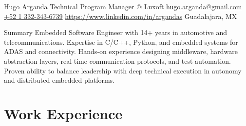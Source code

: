\documentclass{resume} %
\begin{document}

\customheader
    {Hugo Arganda}
    {Technical Program Manager @ Luxoft}
    {\href{mailto:hugo.arganda@gmail.com}{hugo.arganda@gmail.com}}
    {\href{https://wa.me/5213323436739}{+52 1 332-343-6739}}
    {\href{https://www.linkedin.com/in/argandas}{https://www.linkedin.com/in/argandas}}
    {Guadalajara, MX}



\summary
{Summary}
    {Embedded Software Engineer with 14+ years in automotive and telecommunications. Expertise in C/C++, Python, and embedded systems for ADAS and connectivity. Hands-on experience designing middleware, hardware abstraction layers, real-time communication protocols, and test automation. Proven ability to balance leadership with deep technical execution in autonomy and distributed embedded platforms.}



\section{Work Experience}
\end{document}

